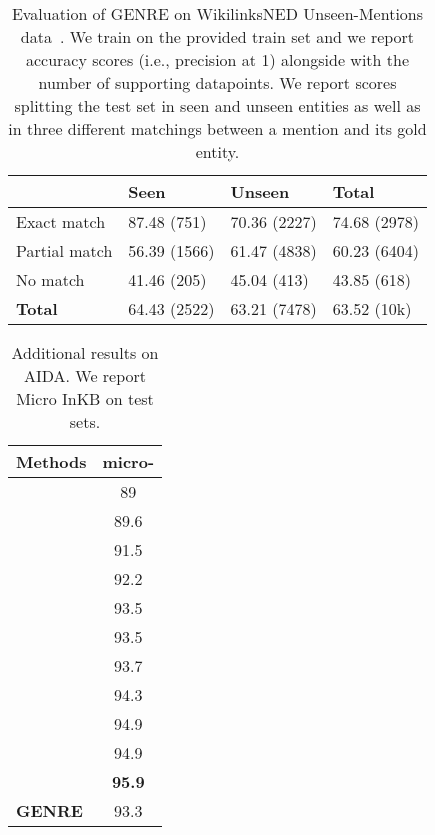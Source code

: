 \documentclass{article} \usepackage{main,times}
\makeatletter
\def\genre{\textsc{GENRE}\@\xspace}
\makeatother
\begin{document}
\begin{table}[!ht]
\centering
\begin{tabular}{lll|l}
\toprule
 &   \textbf{Seen} & \textbf{Unseen} & \textbf{Total} \\
\midrule
Exact match   &   87.48 {\tiny(751)} &  70.36 {\tiny(2227)} &   74.68 {\tiny(2978)} \\
Partial match &  56.39 {\tiny(1566)} &  61.47 {\tiny(4838)} &   60.23 {\tiny(6404)} \\
No match      &   41.46 {\tiny(205)} &   45.04 {\tiny(413)} &    43.85 {\tiny(618)} \\
\midrule
\textbf{Total}         &  64.43 {\tiny(2522)} &  63.21 {\tiny(7478)} &  63.52 {\tiny(10k)} \\
\bottomrule
\end{tabular}
\caption{Evaluation of \genre on WikilinksNED Unseen-Mentions data~\citep{onoe2020fine}. We train on the provided train set and we report accuracy scores (i.e., precision at 1) alongside with the number of supporting datapoints. We report scores splitting the test set in seen and unseen entities as well as in three different matchings between a mention and its gold entity.}
\label{tab:wned_unseen}
\end{table}








\begin{table}[!ht]
\centering
\begin{tabular}{lc}
\toprule
\textbf{Methods} &  \textbf{micro-} \\
\midrule
\citet{guo2018robust}  & 89 \\
\citet{le2019boosting} & 89.6 \\
\citet{yamada-etal-2016-joint} & 91.5 \\
\citet{ganea-hofmann-2017-deep}   & 92.2 \\
\citet{shahbazi2019entity}        & 93.5 \\
\citet{chen2020improving} & 93.5 \\
\citet{yang-etal-2019-learning}   & 93.7 \\
\citet{fang2019joint}  & 94.3  \\
\citet{raiman2018deeptype} &  94.9 \\
\citet{mulang2020evaluating} & 94.9 \\
\citet{yang-etal-2018-collective} & \textbf{95.9} \\
\midrule
\textbf{\genre}      &      93.3  \\
\bottomrule
\end{tabular}
\caption{Additional results on AIDA. We report Micro InKB  on test sets.}
\label{tab:aida-results}
\end{table}
\end{document}
